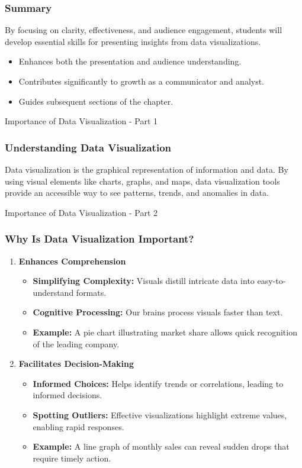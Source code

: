 \documentclass[aspectratio=169]{beamer}
\begin{document}
\begin{frame}[fragile]
    \frametitle{Summary}
    By focusing on clarity, effectiveness, and audience engagement, students will develop essential skills for presenting insights from data visualizations.
    \begin{itemize}
        \item Enhances both the presentation and audience understanding.
        \item Contributes significantly to growth as a communicator and analyst.
        \item Guides subsequent sections of the chapter.
    \end{itemize}
\end{frame}

\begin{frame}[fragile]{Importance of Data Visualization - Part 1}
    \frametitle{Understanding Data Visualization}
    Data visualization is the graphical representation of information and data. By using visual elements like charts, graphs, and maps, data visualization tools provide an accessible way to see patterns, trends, and anomalies in data.
\end{frame}

\begin{frame}[fragile]{Importance of Data Visualization - Part 2}
    \frametitle{Why Is Data Visualization Important?}
    \begin{enumerate}
        \item \textbf{Enhances Comprehension}
        \begin{itemize}
            \item \textbf{Simplifying Complexity:} Visuals distill intricate data into easy-to-understand formats.
            \item \textbf{Cognitive Processing:} Our brains process visuals faster than text.
            \item \textbf{Example:} A pie chart illustrating market share allows quick recognition of the leading company.
        \end{itemize}
        
        \item \textbf{Facilitates Decision-Making}
        \begin{itemize}
            \item \textbf{Informed Choices:} Helps identify trends or correlations, leading to informed decisions.
            \item \textbf{Spotting Outliers:} Effective visualizations highlight extreme values, enabling rapid responses.
            \item \textbf{Example:} A line graph of monthly sales can reveal sudden drops that require timely action.
        \end{itemize}
    \end{enumerate}
\end{frame}
\end{document}
